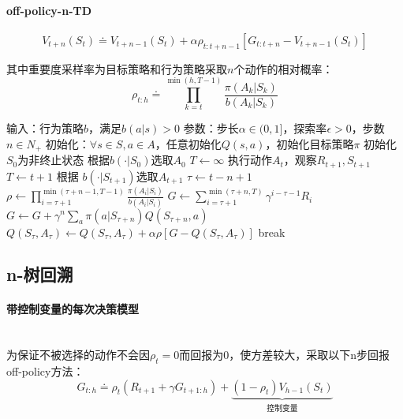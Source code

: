 \documentclass[
12pt, %
a4paper, 
oneside, %
headinclude,footinclude, %
]{scrartcl}
\begin{document}
\paragraph{off-policy-n-TD}
$$ V_{t + n}(S_t) \doteq V_{t + n - 1}(S_t) + \alpha \rho_{t:t + n - 1}[G_{t:t + n} - V_{t + n - 1}(S_t)] $$

其中重要度采样率为目标策略和行为策略采取$ n $个动作的相对概率：
$$ \rho_{t:h} \doteq \prod_{k = t}^{\min(h, T - 1)} \frac{\pi(A_k|S_k)}{b(A_k|S_k)} $$
\begin{myalgorithm}
\State 输入：行为策略$ b $，满足$ b(a|s) > 0 $
\State 参数：步长$ \alpha \in (0,1] $，探索率$ \epsilon > 0 $，步数$ n \in N_+ $
\State 初始化：$ \forall s \in S, a \in A $，任意初始化$ Q(s, a) $，初始化目标策略$ \pi $
\State 初始化$ S_0 $为非终止状态
\State 根据$ b(\cdot|S_0) $选取$ A_0 $
\State $ T \gets \infty $
\State 执行动作$ A_t $，观察$ R_{t + 1},S_{t + 1} $
\State $ T \gets t + 1 $
\Else
\State 根据 $ b(\cdot|S_{t + 1}) $选取$A_{t + 1} $
\EndIf
\EndIf
\State $ \tau \gets t - n + 1 $ 
\State $ \rho \gets \prod_{i = \tau + 1}^{\min(\tau + n - 1,T - 1)} \frac{\pi(A_i|S_i)}{b(A_i|S_i)}$ 
\State $ G \gets \sum_{i = \tau + 1}^{\min(\tau + n,T)} \gamma^{i - \tau - 1}R_i $
\State $ G \gets G + \gamma^n \sum_a\pi(a|S_{\tau + n})Q(S_{\tau + n}, a)$ 
\EndIf
\State $ Q(S_{\tau}, A_{\tau}) \gets Q(S_{\tau}, A_{\tau}) + \alpha \rho[G - Q(S_{\tau}, A_{\tau})] $
\EndIf
{}
\State break
\EndIf
\EndFor
\EndFor
\end{myalgorithm}
\subsection[n-树回溯]{n-树回溯}
\paragraph{带控制变量的每次决策模型}~\\

为保证不被选择的动作不会因$ \rho_t = 0 $而回报为$ 0 $，使方差较大，采取以下n步回报off-policy方法：
$$ G_{t:h} \doteq \rho_t (R_{t + 1} + \gamma G_{t + 1:h}) + \underbrace{(1 - \rho_t) V_{h - 1}(S_t)}_{\text{控制变量}} $$
\end{document}
